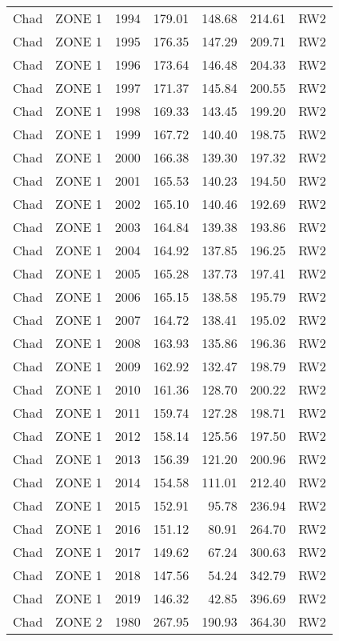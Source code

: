 \begin{longtable}{lllrrrl}
  Chad & ZONE 1 & 1994 & 179.01 & 148.68 & 214.61 & RW2 \\ 
  Chad & ZONE 1 & 1995 & 176.35 & 147.29 & 209.71 & RW2 \\ 
  Chad & ZONE 1 & 1996 & 173.64 & 146.48 & 204.33 & RW2 \\ 
  Chad & ZONE 1 & 1997 & 171.37 & 145.84 & 200.55 & RW2 \\ 
  Chad & ZONE 1 & 1998 & 169.33 & 143.45 & 199.20 & RW2 \\ 
  Chad & ZONE 1 & 1999 & 167.72 & 140.40 & 198.75 & RW2 \\ 
  Chad & ZONE 1 & 2000 & 166.38 & 139.30 & 197.32 & RW2 \\ 
  Chad & ZONE 1 & 2001 & 165.53 & 140.23 & 194.50 & RW2 \\ 
  Chad & ZONE 1 & 2002 & 165.10 & 140.46 & 192.69 & RW2 \\ 
  Chad & ZONE 1 & 2003 & 164.84 & 139.38 & 193.86 & RW2 \\ 
  Chad & ZONE 1 & 2004 & 164.92 & 137.85 & 196.25 & RW2 \\ 
  Chad & ZONE 1 & 2005 & 165.28 & 137.73 & 197.41 & RW2 \\ 
  Chad & ZONE 1 & 2006 & 165.15 & 138.58 & 195.79 & RW2 \\ 
  Chad & ZONE 1 & 2007 & 164.72 & 138.41 & 195.02 & RW2 \\ 
  Chad & ZONE 1 & 2008 & 163.93 & 135.86 & 196.36 & RW2 \\ 
  Chad & ZONE 1 & 2009 & 162.92 & 132.47 & 198.79 & RW2 \\ 
  Chad & ZONE 1 & 2010 & 161.36 & 128.70 & 200.22 & RW2 \\ 
  Chad & ZONE 1 & 2011 & 159.74 & 127.28 & 198.71 & RW2 \\ 
  Chad & ZONE 1 & 2012 & 158.14 & 125.56 & 197.50 & RW2 \\ 
  Chad & ZONE 1 & 2013 & 156.39 & 121.20 & 200.96 & RW2 \\ 
  Chad & ZONE 1 & 2014 & 154.58 & 111.01 & 212.40 & RW2 \\ 
  Chad & ZONE 1 & 2015 & 152.91 & 95.78 & 236.94 & RW2 \\ 
  Chad & ZONE 1 & 2016 & 151.12 & 80.91 & 264.70 & RW2 \\ 
  Chad & ZONE 1 & 2017 & 149.62 & 67.24 & 300.63 & RW2 \\ 
  Chad & ZONE 1 & 2018 & 147.56 & 54.24 & 342.79 & RW2 \\ 
  Chad & ZONE 1 & 2019 & 146.32 & 42.85 & 396.69 & RW2 \\ 
  Chad & ZONE 2 & 1980 & 267.95 & 190.93 & 364.30 & RW2 \\ 

\end{longtable}
